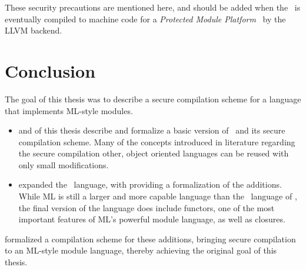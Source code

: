 \begin{itemize}
These security precautions are mentioned here, and should be added when the \LLVMIR\ is eventually compiled to machine code for a \emph{Protected Module Platform}~\cite{PCBAC} by the LLVM backend.
\end{itemize}


\section{Conclusion}
\label{sec:Conclusion}
The goal of this thesis was to describe a secure compilation scheme for a language that implements ML-style modules.
\begin{itemize}
\item
{} and  of this thesis describe and formalize a basic version of \MiniML\ and its secure compilation scheme.
Many of the concepts introduced in literature regarding the secure compilation other, object oriented languages can be reused with only small modifications.

\item
{} expanded the \MiniML\ language, with  providing a formalization of the additions.
While ML is  still a larger and more capable language than the \MiniML\ language of , the final version of the language does include functors, one of the most important features of ML's powerful module language, as well as closures.
\end{itemize}

 formalized a compilation scheme for these additions, bringing secure compilation to an ML-style module language, thereby achieving the original goal of this thesis. 
